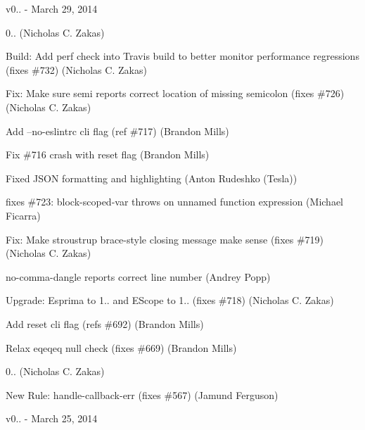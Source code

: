 v0.. -\/ March 29, 2014


\begin{DoxyItemize}
\item 0.. (Nicholas C. Zakas)
\item Build\+: Add perf check into Travis build to better monitor performance regressions (fixes \#732) (Nicholas C. Zakas)
\item Fix\+: Make sure semi reports correct location of missing semicolon (fixes \#726) (Nicholas C. Zakas)
\item Add --no-\/eslintrc cli flag (ref \#717) (Brandon Mills)
\item Fix \#716 crash with reset flag (Brandon Mills)
\item Fixed J\+S\+ON formatting and highlighting (Anton Rudeshko (Tesla))
\item fixes \#723\+: block-\/scoped-\/var throws on unnamed function expression (Michael Ficarra)
\item Fix\+: Make stroustrup brace-\/style closing message make sense (fixes \#719) (Nicholas C. Zakas)
\item no-\/comma-\/dangle reports correct line number (Andrey Popp)
\item Upgrade\+: Esprima to 1.. and E\+Scope to 1.. (fixes \#718) (Nicholas C. Zakas)
\item Add reset cli flag (refs \#692) (Brandon Mills)
\item Relax eqeqeq null check (fixes \#669) (Brandon Mills)
\item 0.. (Nicholas C. Zakas)
\item New Rule\+: handle-\/callback-\/err (fixes \#567) (Jamund Ferguson)
\end{DoxyItemize}

v0.. -\/ March 25, 2014


